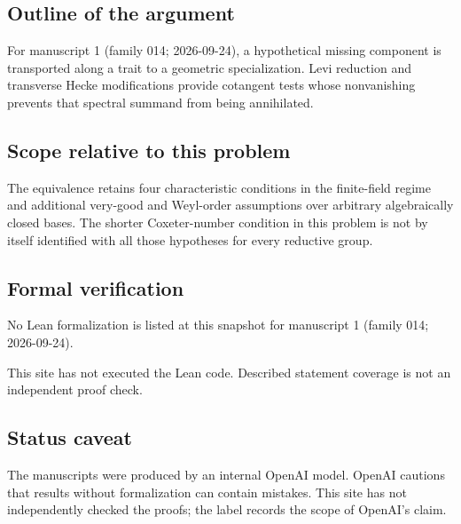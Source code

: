 \documentclass[11pt]{article}
\begin{document}
\subsection{Outline of the argument}
For manuscript 1 (family 014; 2026-09-24), a hypothetical missing component is transported along a trait to a geometric specialization. Levi reduction and transverse Hecke modifications provide cotangent tests whose nonvanishing prevents that spectral summand from being annihilated.

\subsection{Scope relative to this problem}
The equivalence retains four characteristic conditions in the finite-field regime and additional very-good and Weyl-order assumptions over arbitrary algebraically closed bases. The shorter Coxeter-number condition in this problem is not by itself identified with all those hypotheses for every reductive group.

\subsection{Formal verification}
No Lean formalization is listed at this snapshot for manuscript 1 (family 014; 2026-09-24).

This site has not executed the Lean code. Described statement coverage is not an independent proof check.

\subsection{Status caveat}
The manuscripts were produced by an internal OpenAI model. OpenAI cautions that results without formalization can contain mistakes. This site has not independently checked the proofs; the label records the scope of OpenAI's claim.
\end{document}

